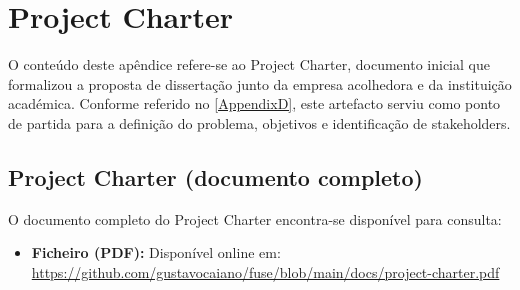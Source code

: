 
\chapter{Project Charter} %

\label{AppendixB} %

O conteúdo deste apêndice refere-se ao Project Charter, documento inicial que formalizou a proposta de dissertação junto da empresa acolhedora e da instituição académica. Conforme referido no \autoref{AppendixD}, este artefacto serviu como ponto de partida para a definição do problema, objetivos e identificação de stakeholders.

\section{Project Charter (documento completo)}
\label{AppendixB:project_charter_pdf}

O documento completo do Project Charter encontra-se disponível para consulta:

\begin{itemize}
    \item \textbf{Ficheiro (PDF):} Disponível online em: \url{https://github.com/gustavocaiano/fuse/blob/main/docs/project-charter.pdf}
\end{itemize}


